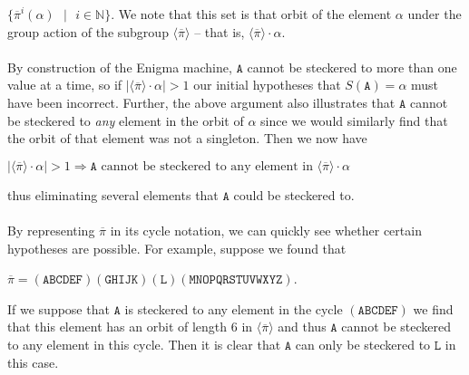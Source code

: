 $\{\overline{\pi}^i(\alpha)\text{ }\vert\text{ }i\in\mathbb{N}\}$.
We note that this set is that orbit of the element $\alpha$ under the
group action of the subgroup $\langle\overline{\pi}\rangle$ -- that is,
$\langle\overline{\pi}\rangle\cdot\alpha$.
\\\\By construction of the Enigma machine, $\texttt{A}$ cannot be steckered to
more than one value at a time, so if
$|\langle\overline{\pi}\rangle\cdot\alpha| > 1$ our initial
hypotheses that $S(\texttt{A}) = \alpha$ must have been incorrect. Further,
the above argument also illustrates that $\texttt{A}$ cannot be steckered to
\emph{any} element in the orbit of $\alpha$ since
we would similarly find that the orbit of that element was not a
singleton. Then we now have
\begin{center}
  $|\langle\overline{\pi}\rangle\cdot\alpha| > 1 \Rightarrow
  \texttt{A} \text{ cannot be steckered to any element in
  }\langle\overline{\pi}\rangle\cdot\alpha$
\end{center}
thus eliminating several elements that $\texttt{A}$ could be steckered to.
\\\\By representing $\overline\pi$ in its cycle notation, we can
quickly see whether certain hypotheses are possible. For example,
suppose we found that
\begin{center}
  $\overline\pi =
  (\texttt{ABCDEF})(\texttt{GHIJK})(\texttt{L})(\texttt{MNOPQRSTUVWXYZ})$.
\end{center}
If we suppose that $\texttt{A}$ is steckered to any element in the cycle
$(\texttt{ABCDEF})$ we find that this
element has an orbit of length $6$ in $\langle\overline\pi\rangle$
and thus $\texttt{A}$ cannot be steckered
to any element in this cycle. Then it is clear that $\texttt{A}$ can only be
steckered to $\texttt{L}$ in this case.

